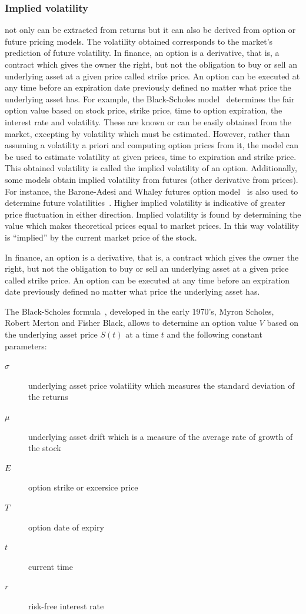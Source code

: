 \subsubsection{Implied volatility} not only can be extracted from returns
but it can also be derived from option or future pricing models.  The
volatility obtained corresponds to the market's prediction of future
volatility. In finance, an option is a derivative, that is, a contract which
gives the owner the right, but not the obligation to buy or sell an underlying
asset at a given price called strike price. An option can be executed at any
time before an expiration date previously defined no matter what price the
underlying asset has. For example, the Black-Scholes model~\cite{black1973}
determines the fair option value based on stock price, strike price, time to
option expiration, the interest rate and volatility. These are known or can be
easily obtained from the market, excepting by volatility which must be
estimated. However, rather than assuming a volatility a priori and computing
option prices from it, the model can be used to estimate volatility at given
prices, time to expiration and strike price. This obtained volatility is called
the implied volatility of an option. Additionally, some models obtain implied
volatility from futures (other derivative from prices). For instance, the
Barone-Adesi and Whaley futures option model~\cite{baroneetal1987} is also used
to determine future volatilities~\cite{hamidetal2004}. Higher implied
volatility is indicative of greater price fluctuation in either direction.
Implied volatility is found by determining the value which makes theoretical
prices equal to market prices. In this way volatility is ``implied'' by the
current market price of the stock.

In finance, an option is a derivative, that is, a contract which gives the owner
the right, but not the obligation to buy or sell an underlying asset at a given
price called strike price. An option can be executed at any time before an
expiration date previously defined no matter what price the underlying asset
has. 

The Black-Scholes formula~\cite{black1973}, developed in the early 1970's, Myron
Scholes, Robert Merton and Fisher Black,  allows to determine an option value
$V$ based on the underlying asset price $S(t)$ at a time $t$ and the following
constant parameters: 

\begin{description}
\item [$\sigma$] underlying asset price volatility which measures the standard
deviation of the returns
\item [$\mu$] underlying asset drift which is a measure of the average rate of
growth of the stock
\item[$E$] option strike or excersice price
\item[$T$] option date of expiry
\item[$t$] current time
\item[$r$] risk-free interest rate
\end{description}

